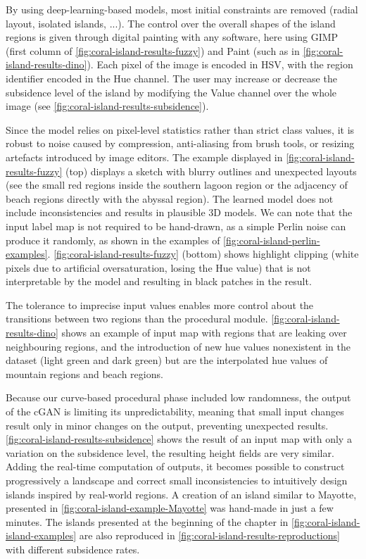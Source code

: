 By using deep-learning-based models, most initial constraints are removed (radial layout, isolated islands, ...). The control over the overall shapes of the island regions is given through digital painting with any software, here using GIMP (first column of \cref{fig:coral-island-results-fuzzy}) and Paint (such as in \cref{fig:coral-island-results-dino}). Each pixel of the image is encoded in HSV, with the region identifier encoded in the Hue channel. The user may increase or decrease the subsidence level of the island by modifying the Value channel over the whole image (see \cref{fig:coral-island-results-subsidence}).

Since the model relies on pixel-level statistics rather than strict class values, it is robust to noise caused by compression, anti-aliasing from brush tools, or resizing artefacts introduced by image editors. The example displayed in \cref{fig:coral-island-results-fuzzy} (top) displays a sketch with blurry outlines and unexpected layouts (see the small red regions inside the southern lagoon region or the adjacency of beach regions directly with the abyssal region). The learned model does not include inconsistencies and results in plausible 3D models. We can note that the input label map is not required to be hand-drawn, as a simple Perlin noise can produce it randomly, as shown in the examples of \cref{fig:coral-island-perlin-examples}. \cref{fig:coral-island-results-fuzzy} (bottom) shows highlight clipping (white pixels due to artificial oversaturation, losing the Hue value) that is not interpretable by the model and resulting in black patches in the result. 

The tolerance to imprecise input values enables more control about the transitions between two regions than the procedural module. \cref{fig:coral-island-results-dino} shows an example of input map with regions that are leaking over neighbouring regions, and the introduction of new hue values nonexistent in the dataset (light green and dark green) but are the interpolated hue values of mountain regions and beach regions.

Because our curve-based procedural phase included low randomness, the output of the cGAN is limiting its unpredictability, meaning that small input changes result only in minor changes on the output, preventing unexpected results. \cref{fig:coral-island-results-subsidence} shows the result of an input map with only a variation on the subsidence level, the resulting height fields are very similar. Adding the real-time computation of outputs, it becomes possible to construct progressively a landscape and correct small inconsistencies to intuitively design islands inspired by real-world regions. A creation of an island similar to Mayotte, presented in \cref{fig:coral-island-example-Mayotte} was hand-made in just a few minutes. The islands presented at the beginning of the chapter in \cref{fig:coral-island-island-examples} are also reproduced in \cref{fig:coral-island-results-reproductions} with different subsidence rates.

